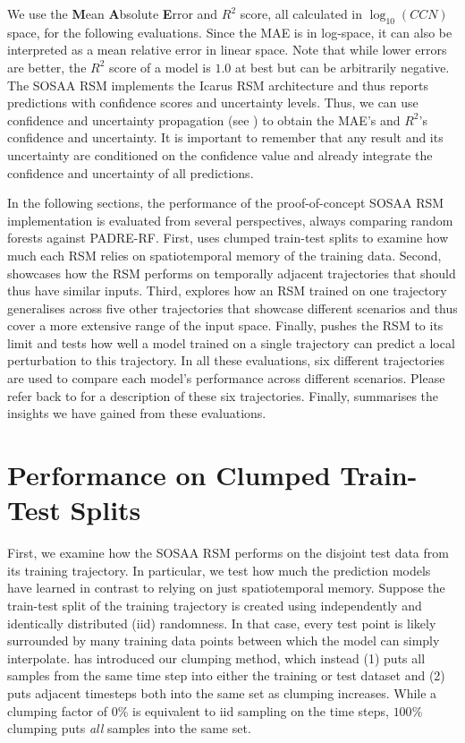 \noindent We use the \textbf{M}ean \textbf{A}bsolute \textbf{E}rror and $R^2$ score, all calculated in $\log_{10}(CCN)$ space, for the following evaluations. Since the MAE is in log-space, it can also be interpreted as a mean relative error in linear space. Note that while lower errors are better, the $R^2$ score of a model is $1.0$ at best but can be arbitrarily negative. The SOSAA RSM implements the Icarus RSM architecture and thus reports predictions with confidence scores and uncertainty levels. Thus, we can use confidence and uncertainty propagation (see ) to obtain the MAE's and $R^2$'s confidence and uncertainty. It is important to remember that any result and its uncertainty are conditioned on the confidence value and already integrate the confidence and uncertainty of all predictions.

In the following sections, the performance of the proof-of-concept SOSAA RSM implementation is evaluated from several perspectives, always comparing random forests against PADRE-RF. First,  uses clumped train-test splits to examine how much each RSM relies on spatiotemporal memory of the training data. Second,  showcases how the RSM performs on temporally adjacent trajectories that should thus have similar inputs. Third,  explores how an RSM trained on one trajectory generalises across five other trajectories that showcase different scenarios and thus cover a more extensive range of the input space. Finally,  pushes the RSM to its limit and tests how well a model trained on a single trajectory can predict a local perturbation to this trajectory. In all these evaluations, six different trajectories are used to compare each model's performance across different scenarios. Please refer back to  for a description of these six trajectories. Finally,  summarises the insights we have gained from these evaluations.

\section{Performance on Clumped Train-Test Splits} \label{txt:clump-generalisation}

First, we examine how the SOSAA RSM performs on the disjoint test data from its training trajectory. In particular, we test how much the prediction models have learned in contrast to relying on just spatiotemporal memory. Suppose the train-test split of the training trajectory is created using independently and identically distributed (iid) randomness. In that case, every test point is likely surrounded by many training data points between which the model can simply interpolate.  has introduced our clumping method, which instead (1) puts all samples from the same time step into either the training or test dataset and (2) puts adjacent timesteps both into the same set as clumping increases. While a clumping factor of $0\%$ is equivalent to iid sampling on the time steps, $100\%$ clumping puts \textit{all} samples into the same set.

